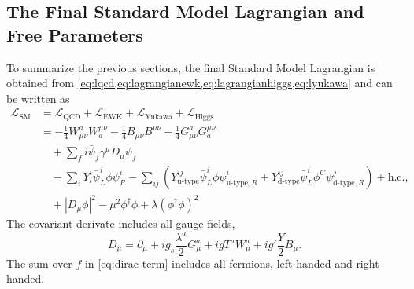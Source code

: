 \subsection{The Final Standard Model Lagrangian and Free Parameters}
\label{subsec:final-lagrangian}
To summarize the previous sections, the final Standard Model Lagrangian is obtained from \cref{eq:lqcd,eq:lagrangianewk,eq:lagrangianhiggs,eq:lyukawa} and can be written as
\begin{align}
  \mathcal{L}_\text{SM} &= \mathcal{L}_\text{QCD} + \mathcal{L}_\text{EWK} + \mathcal{L}_\text{Yukawa} + \mathcal{L}_\text{Higgs} \\
   &= - \frac{1}{4}W_{\mu\nu}^aW^{\mu\nu}_{a} - \frac{1}{4} B_{\mu\nu}B^{\mu\nu} - \frac{1}{4}G_{\mu\nu}^aG^{\mu\nu}_{a} \\
   \label{eq:dirac-term}
   & \quad + \sum_f i \bar{\psi}_f\gamma^\mu D_\mu\psi_f \\
   & \quad - \sum_{i} Y_l^i \bar{\psi}^{i}_{L} \phi \psi^{i}_{R} - \sum_{ij} \left( Y_{\text{u-type}}^{ij} \bar{\psi}^{i}_{L} \phi \psi^{i}_{\text{u-type},R} + Y_{\text{d-type}}^{ij} \bar{\psi}^{i}_{L} \phi^C \psi^{j}_{\text{d-type}, R} \right) + \text{h.c.},  \\
   & \quad + |D_\mu\phi|^2 - \mu^2\phi^\dagger\phi + \lambda \left(\phi^\dagger\phi \right)^2
\end{align}
The covariant derivate includes all gauge fields,
\begin{equation}
  D_\mu = \partial_\mu + i g_s \frac{\lambda^a}{2} G_\mu^a + igT^aW_\mu^a + ig'\frac{Y}{2}B_\mu.
\end{equation}
The sum over $f$ in \cref{eq:dirac-term} includes all fermions, left-handed and right-handed.

